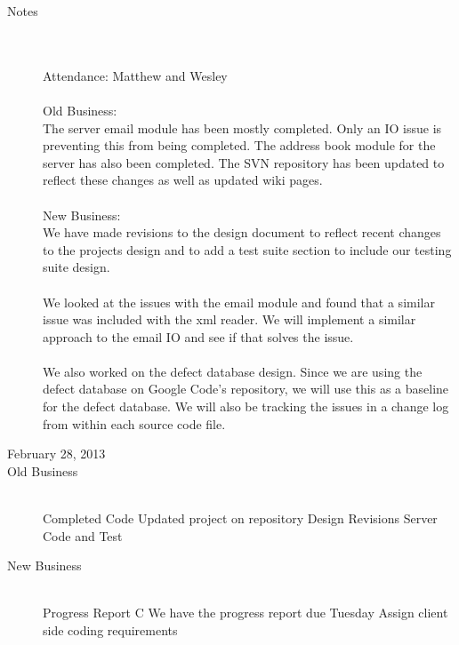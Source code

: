 \documentclass[11pt, letterpaper]{report}
\begin{document}
\begin{description}
\item[Notes] \hfill \\ \hfill \\
Attendance:  Matthew and Wesley\\ \\
Old Business: \\
The server email module has been mostly completed. Only an IO issue is preventing this from being completed. The address book module for the server has also been completed. The SVN repository has been updated to reflect these changes as well as updated wiki pages.
\\ \\
New Business: \\
We have made revisions to the design document to reflect recent changes to the projects design and to add a test suite section to include our testing suite design. \\ \\
We looked at the issues with the email module and found that a similar issue was included with the xml reader. We will implement a similar approach to the email IO and see if that solves the issue. \\ \\
We also worked on the defect database design. Since we are using the defect database on Google Code's repository, we will use this as a baseline for the defect database. We will also be tracking the issues in a change log from within each source code file.



\newpage
\item[\Large February 28, 2013]
\hypertarget{February 28, 2013} {}
\item[Old Business] \hfill \\
\subitem Completed Code
\subitem Updated project on repository
\subitem Design Revisions
\subitem Server Code and Test
\item[New Business] \hfill \\
\subitem Progress Report C
\subsubitem We have the progress report due Tuesday
\subitem Assign client side coding requirements \\




\end{description}
\end{document}
